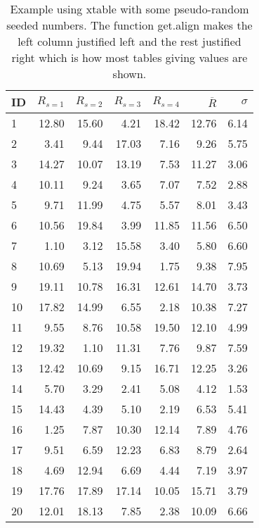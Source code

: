 \documentclass[11pt]{book}\usepackage[]{graphicx}\usepackage[]{color}
\begin{document}
 

\begin{table}[ht]
\centering
\caption{Example using xtable with some pseudo-random seeded numbers. The function get.align makes the left column justified left and the rest justified right which is how most tables giving values are shown.} 
\label{tab:example-xtable}
\begin{tabular}{lrrrrrr}
  \hline
\textbf{ID} & $R_{s=1}$ & $R_{s=2}$ & $R_{s=3}$ & $R_{s=4}$ & $\overline{R}$ & $\sigma$ \\ 
  \hline
  1 & 12.80 & 15.60 & 4.21 & 18.42 & 12.76 & 6.14 \\ 
    2 & 3.41 & 9.44 & 17.03 & 7.16 & 9.26 & 5.75 \\ 
    3 & 14.27 & 10.07 & 13.19 & 7.53 & 11.27 & 3.06 \\ 
    4 & 10.11 & 9.24 & 3.65 & 7.07 & 7.52 & 2.88 \\ 
    5 & 9.71 & 11.99 & 4.75 & 5.57 & 8.01 & 3.43 \\ 
    6 & 10.56 & 19.84 & 3.99 & 11.85 & 11.56 & 6.50 \\ 
    7 & 1.10 & 3.12 & 15.58 & 3.40 & 5.80 & 6.60 \\ 
    8 & 10.69 & 5.13 & 19.94 & 1.75 & 9.38 & 7.95 \\ 
    9 & 19.11 & 10.78 & 16.31 & 12.61 & 14.70 & 3.73 \\ 
   10 & 17.82 & 14.99 & 6.55 & 2.18 & 10.38 & 7.27 \\ 
   11 & 9.55 & 8.76 & 10.58 & 19.50 & 12.10 & 4.99 \\ 
   12 & 19.32 & 1.10 & 11.31 & 7.76 & 9.87 & 7.59 \\ 
   13 & 12.42 & 10.69 & 9.15 & 16.71 & 12.25 & 3.26 \\ 
   14 & 5.70 & 3.29 & 2.41 & 5.08 & 4.12 & 1.53 \\ 
   15 & 14.43 & 4.39 & 5.10 & 2.19 & 6.53 & 5.41 \\ 
   16 & 1.25 & 7.87 & 10.30 & 12.14 & 7.89 & 4.76 \\ 
   17 & 9.51 & 6.59 & 12.23 & 6.83 & 8.79 & 2.64 \\ 
   18 & 4.69 & 12.94 & 6.69 & 4.44 & 7.19 & 3.97 \\ 
   19 & 17.76 & 17.89 & 17.14 & 10.05 & 15.71 & 3.79 \\ 
   20 & 12.01 & 18.13 & 7.85 & 2.38 & 10.09 & 6.66 \\ 
   \hline
\end{tabular}
\end{table}
\end{document}
